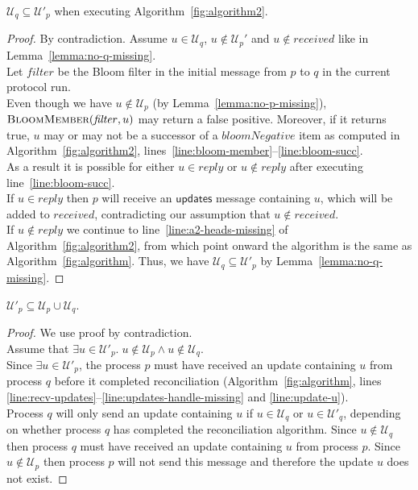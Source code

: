 \documentclass[a4paper,anonymous,USenglish]{lipics-v2019}
\begin{document}
\begin{lemma}\label{lemma:no-q-missing2}
$\mathcal{U}_q \subseteq \mathcal{U}'_p$ when executing Algorithm~\ref{fig:algorithm2}.
\end{lemma}
\begin{proof}
By contradiction.
Assume $u \in \mathcal{U}_q$, $u \notin \mathcal{U}_p'$ and $u \notin \mathit{received}$ like in Lemma~\ref{lemma:no-q-missing}.\\
Let $\mathit{filter}$ be the Bloom filter in the initial message from $p$ to $q$ in the current protocol run.\\
Even though we have $u \notin \mathcal{U}_p$ (by Lemma~\ref{lemma:no-p-missing}), $\textsc{BloomMember}(\mathit{filter}, u)$ may return a false positive.
Moreover, if it returns true, $u$ may or may not be a successor of a $\mathit{bloomNegative}$ item as computed in Algorithm~\ref{fig:algorithm2}, lines~\ref{line:bloom-member}--\ref{line:bloom-succ}.\\
As a result it is possible for either $u \in \mathit{reply}$ or $u \notin \mathit{reply}$ after executing line~\ref{line:bloom-succ}.\\
If $u \in \mathit{reply}$ then $p$ will receive an $\mathsf{updates}$ message containing $u$, which will be added to $\mathit{received}$, contradicting our assumption that $u \notin \mathit{received}$.\\
If $u \notin \mathit{reply}$ we continue to line~\ref{line:a2-heads-missing} of Algorithm~\ref{fig:algorithm2}, from which point onward the algorithm is the same as Algorithm~\ref{fig:algorithm}.
Thus, we have $\mathcal{U}_q \subseteq \mathcal{U}'_p$ by Lemma~\ref{lemma:no-q-missing}.
\end{proof}

\begin{lemma}\label{lemma:no-extras}
$\mathcal{U}'_p \subseteq \mathcal{U}_p \cup \mathcal{U}_q$.
\end{lemma}
\begin{proof}
We use proof by contradiction.\\
Assume that $\exists u \in \mathcal{U}'_p.\; u \notin \mathcal{U}_p  \land  u \notin \mathcal{U}_q$.\\
Since $\exists u \in \mathcal{U}'_p$, the process $p$ must have received an update containing $u$ from process $q$ before it completed reconciliation (Algorithm~\ref{fig:algorithm}, lines \ref{line:recv-updates}--\ref{line:updates-handle-missing} and \ref{line:update-u}).\\
Process $q$ will only send an update containing $u$ if $u \in \mathcal{U}_q$ or $u \in \mathcal{U}'_q$, depending on whether process $q$ has completed the reconciliation algorithm.
Since $u \notin \mathcal{U}_q$ then process $q$ must have received an update containing $u$ from process $p$.
Since $u \notin \mathcal{U}_p$ then process $p$ will not send this message and therefore the update $u$ does not exist.
\end{proof}
\end{document}
